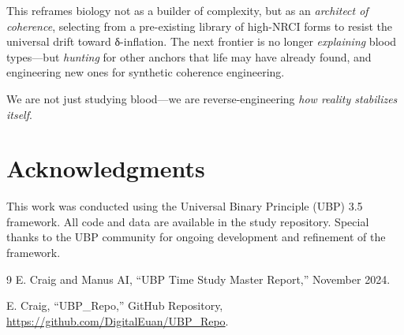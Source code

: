 \documentclass[11pt]{article}
\begin{document}
This reframes biology not as a builder of complexity, but as an \textit{architect of coherence}, selecting from a pre-existing library of high-NRCI forms to resist the universal drift toward δ-inflation. The next frontier is no longer \textit{explaining} blood types—but \textit{hunting} for other anchors that life may have already found, and engineering new ones for synthetic coherence engineering.

We are not just studying blood—we are reverse-engineering \textit{how reality stabilizes itself}.

\section*{Acknowledgments}

This work was conducted using the Universal Binary Principle (UBP) 3.5 framework. All code and data are available in the study repository. Special thanks to the UBP community for ongoing development and refinement of the framework.

\begin{thebibliography}{9}
E. Craig and Manus AI, ``UBP Time Study Master Report,'' November 2024.

E. Craig, ``UBP\_Repo,'' GitHub Repository, \url{https://github.com/DigitalEuan/UBP_Repo}.

\end{thebibliography}
\end{document}
